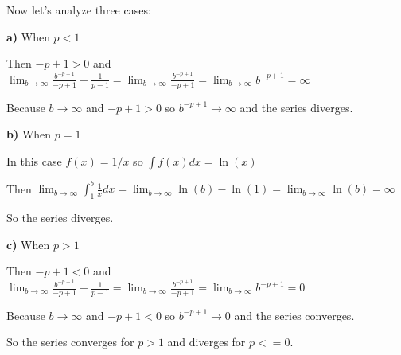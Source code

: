 \singlespacing

Now let's analyze three cases:

\singlespacing

\textbf{a)} When $p<1$

\singlespacing

Then $-p+1 > 0$ and $\lim_{b \to \infty} \frac{b^{-p+1}}{-p+1}  + \frac{1}{p-1} = \lim_{b \to \infty} \frac{b^{-p+1}}{-p+1} = \lim_{b \to \infty} b^{-p+1} = \infty$

\singlespacing

Because $b \to \infty$ and $-p+1 > 0$ so $b^{-p+1} \to \infty$ and the series diverges.

\singlespacing

\textbf{b)} When $p=1$

\singlespacing

In this case $f(x) = 1/x$ so $\int f(x) dx = \ln(x)$

\singlespacing

Then $\lim_{b \to \infty} \int_{1}^{b} \frac{1}{x} dx = \lim_{b \to \infty} \ln(b) - \ln(1) = \lim_{b \to \infty} \ln(b) = \infty$

\singlespacing

So the series diverges.

\singlespacing

\textbf{c)} When $p>1$

\singlespacing

Then $-p+1 < 0$ and $\lim_{b \to \infty} \frac{b^{-p+1}}{-p+1}  + \frac{1}{p-1} = \lim_{b \to \infty} \frac{b^{-p+1}}{-p+1} = \lim_{b \to \infty} b^{-p+1} = 0$

\singlespacing

Because $b \to \infty$ and $-p+1 < 0$ so $b^{-p+1} \to 0$ and the series converges.

\singlespacing
\singlespacing
\singlespacing

So the series converges for $p>1$ and diverges for $p<=0$.